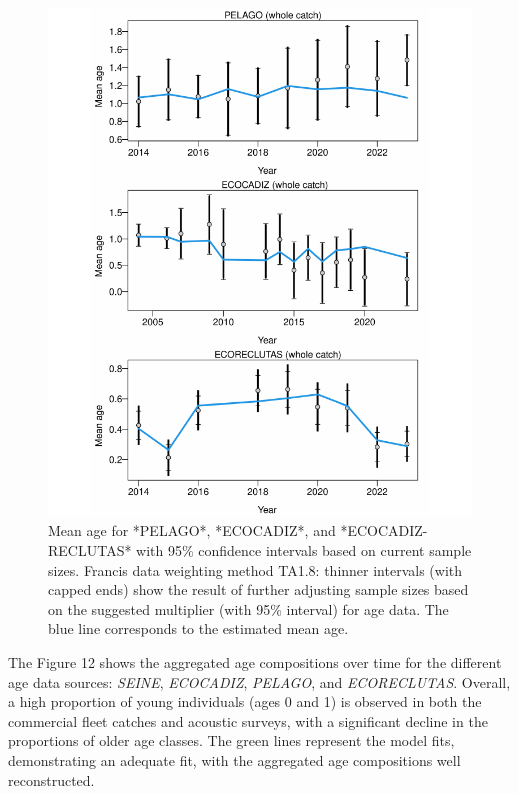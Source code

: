 \documentclass[
]{article}
\begin{document}
\begin{figure}[H]

{\centering \includegraphics[width=0.95\linewidth]{Report_SS3_quarter_with_age_data_MR_prueba_mod_files/figure-latex/unnamed-chunk-17-1} 

}

\caption{Mean age for *PELAGO*, *ECOCADIZ*, and *ECOCADIZ-RECLUTAS* with 95\% confidence intervals based on current sample sizes. Francis data weighting method TA1.8: thinner intervals (with capped ends) show the result of further adjusting sample sizes based on the suggested multiplier (with 95\% interval) for age data. The blue line corresponds to the estimated mean age.}\label{fig:unnamed-chunk-17}
\end{figure}

The Figure 12 shows the aggregated age compositions over time for the
different age data sources: \emph{SEINE}, \emph{ECOCADIZ},
\emph{PELAGO}, and \emph{ECORECLUTAS}. Overall, a high proportion of
young individuals (ages 0 and 1) is observed in both the commercial
fleet catches and acoustic surveys, with a significant decline in the
proportions of older age classes. The green lines represent the model
fits, demonstrating an adequate fit, with the aggregated age
compositions well reconstructed.
\end{document}
